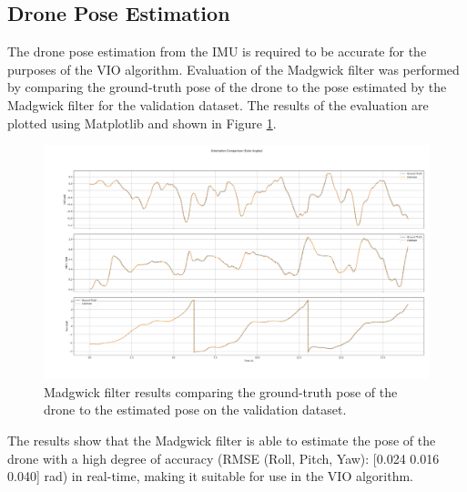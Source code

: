 \documentclass[bare_jrnl_transmag]{subfiles}
\begin{document}
\subsection{Drone Pose Estimation}
The drone pose estimation from the IMU is required to be accurate for the purposes of the VIO algorithm. Evaluation of the Madgwick filter was performed by comparing the ground-truth pose of the drone to the pose estimated by the Madgwick filter for the validation dataset. The results of the evaluation are plotted using Matplotlib \cite{matplotlib} and shown in Figure \ref{fig:madgwick_results}.

\begin{figure}[H]
    \centering
    \includegraphics[width=0.8\linewidth]{figures/madgwick_results.png}
    \caption{Madgwick filter results comparing the ground-truth pose of the drone to the estimated pose on the validation dataset.}
    \label{fig:madgwick_results}
\end{figure}

The results show that the Madgwick filter is able to estimate the pose of the drone with a high degree of accuracy (RMSE (Roll, Pitch, Yaw): [0.024 0.016 0.040] rad) in real-time, making it suitable for use in the VIO algorithm.
\end{document}
